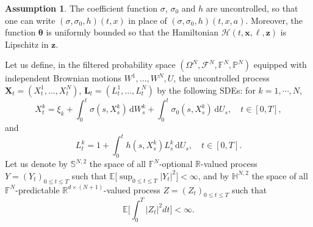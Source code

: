 \documentclass[11pt]{article}
\numberwithin{equation}{section}
\theoremstyle{plain}
\theoremstyle{definition}
\newtheorem{assumption}{Assumption}
\theoremstyle{remark}
\newcommand{\R}{\mathbb{R}}
\newcommand{\bE}{\mathbb{E}}
\newcommand{\dd}{\mathrm{d}}
\newcommand{\Fc}{\mathcal{F}}
\newcommand{\F}{\mathbb{F}}
\newcommand{\bP}{\mathbb{P}}
\begin{document}
	\begin{assumption} \label{assum:BSDE}
		The coefficient function $\sigma$, $\sigma_0$ and $h$ are uncontrolled, so that one can write $(\sigma, \sigma_0, h)(t,x)$ in place of $(\sigma, \sigma_0, h)(t,x,a)$.
		Moreover, the function $\mathbf{\theta}$ is uniformly bounded so that the Hamiltonian $\mathcal{H}(t,\mathbf{x},\bm{\ell},\mathbf{z})$ is Lipschitz in $\mathbf{z}$.
	\end{assumption}
	
	Let us define, in the filtered probability space $(\Omega^N, \Fc^N, \F^N, \bP^N)$ equipped with independent Brownian motions $W^1, \dots, W^N, U$,
	the uncontrolled process $\mathbf{X}_t = (X_t^1, \dots, X_t^N)$, $\mathbf{L}_t = (L_t^1, \dots, L_t^N)$ by the following SDEs: for $k=1, \cdots, N$,
	$$
	X_t^k = \xi_k +  \int_0^t \sigma(s, X_s^k)\,\dd W_s^k + \int_0^t \sigma_0(s, X_s^k)\,\dd U_s, \quad t \in [0,T],
	$$
	and
	$$
	L_t^k = 1 + \int_0^t  h(s, X_s^k)L_s^k\,\dd U_s, \quad t \in [0,T].
	$$
	Let us denote by $\mathbb{S}^{N,2}$ the space of all $\F^N$-optional $\R$-valued process $Y = (Y_t)_{0 \le t \le T}$ such that $\bE \big[ \sup_{0 \le t \le T} |Y_t|^2 \big] < \infty$,
	and by $\mathbb{H}^{N,2}$ the space of all $\F^N$-predictable $\R^{d \times (N+1)}$-valued process $Z = (Z_t)_{0 \le t \le T}$ such that
	$$
	\bE \Big[ \int_0^T \big| Z_t \big|^2 dt \Big] < \infty.
	$$
	
\end{document}
